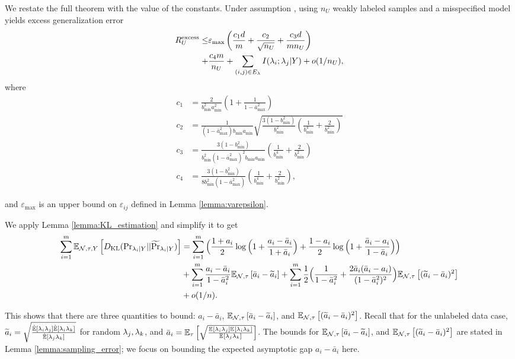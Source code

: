 We restate the full theorem with the value of the constants. Under assumption , using $n_U$ weakly labeled samples and a misspecified model yields excess generalization error
\begin{align}
    R_U^{\mathrm{excess}} \le  & \varepsilon_{\max} \left(\frac{c_1 d}{m} + \frac{c_2}{\sqrt{n_U}} + \frac{c_3 d}{m n_U}\right) \nonumber \\
    + &\frac{c_4 m}{n_U} + \sum_{(i, j) \in E_{\lambda}}I(\lambda_i; \lambda_j | Y) + o(1/n_U), \nonumber
\end{align}
where 
\begin{align*}
    c_1 &=  \frac{2}{b_{\min}^2 a_{\min}^2} \left(1 + \frac{1}{1 - \bar{a}_{\max}^2} \right) \\
    c_2 &= \frac{1}{(1 - \bar{a}_{\max}^2) b_{\min} a_{\min}} \sqrt{\frac{3(1 - b_{\min}^2)}{b_{\min}^2} \left(\frac{1}{b_{\min}^4} + \frac{2}{b_{\min}^2} \right)} \\
    c_3 &= \frac{3(1 - b_{\min}^2)}{b_{\min}^2 (1 - \bar{a}_{\max}^2)^2 b_{\min} a_{\min}} \left(\frac{1}{b_{\min}^4} + \frac{2}{b_{\min}^2} \right) \\
    c_4 &= \frac{3(1 - b_{\min}^2)}{8b_{\min}^2 (1 - \bar{a}_{\max}^2)} \left(\frac{1}{b_{\min}^4} + \frac{2}{b_{\min}^2} \right),
\end{align*}

and $\varepsilon_{\max}$ is an upper bound on $\varepsilon_{ij}$ defined in Lemma \ref{lemma:varepsilon}.

We apply Lemma \ref{lemma:KL_estimation} and simplify it to get
\begin{align}
    \sum_{i = 1}^m \mathbb{E}_{\mathcal{N}, \tau, Y}\left[D_{\mathrm{KL}} (\mathrm{Pr}_{\lambda_i | Y} || \widetilde{\Pr}_{\lambda_i | Y} )\right] &= \sum_{i = 1}^m \Big(\frac{1 + a_i}{2} \log \Big(1 + \frac{a_i - \bar{a}_i}{1 + \bar{a}_i}\Big) + \frac{1 - a_i}{2} \log \Big(1 + \frac{\bar{a}_i - a_i}{1 - \bar{a}_i} \Big)\Big)  \label{eq:acc_decomposition}\\
    &+ \sum_{i = 1}^m \frac{a_i - \bar{a}_i}{1 - \bar{a}_i^2} \mathbb{E}_{\mathcal{N}, \tau}\left[\bar{a}_i - \widetilde{a}_i \right] 
    + \sum_{i = 1}^m \frac{1}{2}\Big( \frac{1}{1 - \bar{a}_i^2} + \frac{2\bar{a}_i(\bar{a}_i - a_i)}{(1 - \bar{a}_i^2)^2}\Big) \mathbb{E}_{\mathcal{N}, \tau}\left[(\widetilde{a}_i - \bar{a}_i)^2\right] \nonumber \\
    &+ o(1/n).\nonumber 
\end{align}

This shows that there are three quantities to bound: $a_i - \bar{a}_i$, $\mathbb{E}_{\mathcal{N}, \tau}\left[\bar{a}_i - \widetilde{a}_i\right]$, and $\mathbb{E}_{\mathcal{N}, \tau}\left[(\widetilde{a}_i - \bar{a}_i)^2\right]$. Recall that for the unlabeled data case, $\widetilde{a}_i = \sqrt{\frac{\hat{\mathbb{E}}\left[\lambda_i \lambda_j\right] \hat{\mathbb{E}}\left[\lambda_i \lambda_k\right]}{\hat{\mathbb{E}}\left[\lambda_j \lambda_k\right]}}$ for random $\lambda_j, \lambda_k$, and $\bar{a}_i = \mathbb{E}_{\tau}\left[\sqrt{\frac{\mathbb{E}_{}\left[\lambda_i \lambda_j\right] \mathbb{E}_{}\left[\lambda_i \lambda_k\right]}{\mathbb{E}_{}\left[\lambda_j \lambda_k\right]}}\right]$. The bounds for $\mathbb{E}_{\mathcal{N}, \tau}\left[\bar{a}_i - \widetilde{a}_i\right]$, and $\mathbb{E}_{\mathcal{N}, \tau}\left[(\widetilde{a}_i - \bar{a}_i)^2\right]$ are stated in Lemma \ref{lemma:sampling_error}; we focus on bounding the expected asymptotic gap $a_i - \bar{a}_i$ here. 

